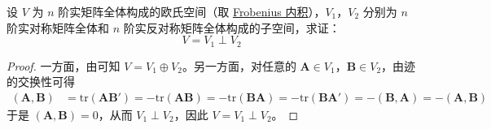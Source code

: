 \documentclass[../../main.tex]{subfiles}%
\begin{document}
\begin{proposition}\label{proposition:例9.22}
设 $V$ 为 $n$ 阶实矩阵全体构成的欧氏空间（取 \hyperlink{Frobenius 内积}{Frobenius 内积}），$V_1$，$V_2$ 分别为 $n$ 阶实对称矩阵全体和 $n$ 阶实反对称矩阵全体构成的子空间，求证：
\[ V = V_1 \perp V_2 \]
\end{proposition}
\begin{proof}
一方面，由可知 $V = V_1 \oplus V_2$。另一方面，对任意的 $\boldsymbol{A} \in V_1$，$\boldsymbol{B} \in V_2$，由迹的交换性可得
\begin{align*}
(\boldsymbol{A}, \boldsymbol{B}) &= \mathrm{tr}(\boldsymbol{A}\boldsymbol{B}') = -\mathrm{tr}(\boldsymbol{A}\boldsymbol{B}) = -\mathrm{tr}(\boldsymbol{B}\boldsymbol{A}) = -\mathrm{tr}(\boldsymbol{B}\boldsymbol{A}') = -(\boldsymbol{B}, \boldsymbol{A}) = -(\boldsymbol{A}, \boldsymbol{B})
\end{align*}
于是 $(\boldsymbol{A}, \boldsymbol{B}) = 0$，从而 $V_1 \perp V_2$，因此 $V = V_1 \perp V_2$。
\end{proof}
\end{document}

